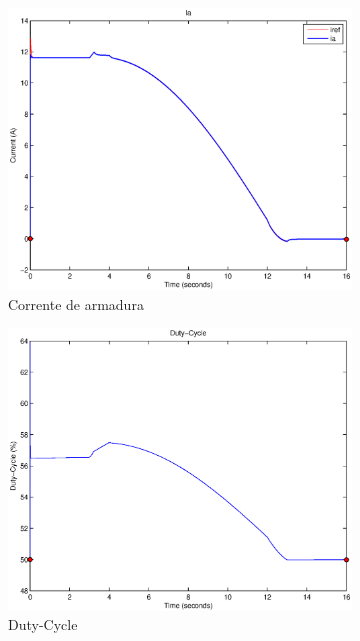 \documentclass{article}
\begin{document}
\begin{figure}[H]
\begin{subfigure}{0.32\textwidth}
		\includegraphics[width=\linewidth]{matlab/ia4}
		\caption{Corrente de armadura}
	\end{subfigure}
	\begin{subfigure}{0.32\textwidth}
		\includegraphics[width=\linewidth]{matlab/d4}
		\caption{Duty-Cycle}
	\end{subfigure}
	\begin{subfigure}{0.32\textwidth}

\end{subfigure}
\end{figure}
\end{document}
